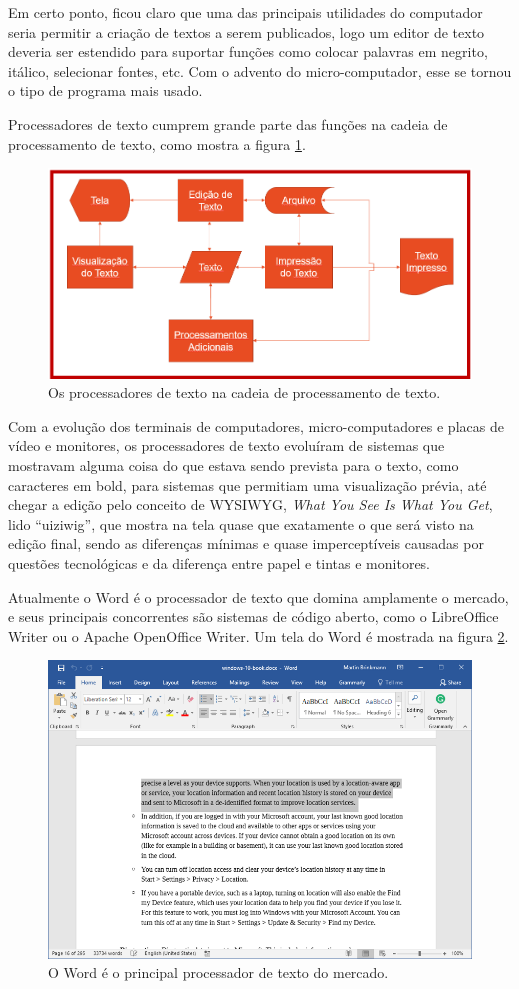 Em certo ponto,  ficou claro que uma das principais utilidades do computador seria permitir a criação de textos a serem publicados, logo um editor de texto deveria ser estendido para suportar funções como colocar palavras em negrito, itálico, selecionar fontes, etc. Com o advento do micro-computador, esse se tornou o tipo de programa mais usado. 

Processadores de texto cumprem grande parte das funções na cadeia de processamento de texto, como mostra a figura \ref{fig:processador}.

\begin{figure}[hbt]
    \centering
    \includegraphics[width=0.7\linewidth]{Images/processador}
    \caption[Os processadores de texto]{Os processadores de texto na cadeia de processamento de texto.}
    \label{fig:processador}
\end{figure}

Com a evolução dos terminais de computadores, micro-computadores e placas de vídeo e monitores, os processadores de texto evoluíram de sistemas que mostravam alguma coisa do que estava sendo prevista para o texto, como caracteres em bold, para sistemas que permitiam uma visualização prévia, até chegar a edição pelo conceito de WYSIWYG, \textit{What You See Is What You Get}, lido \enquote{uiziwig},  que mostra na tela quase que exatamente o que será visto na edição final, sendo as diferenças mínimas e quase imperceptíveis causadas por questões tecnológicas e da diferença entre papel e tintas e monitores.


Atualmente o Word é o processador de texto que domina amplamente o mercado, e seus principais concorrentes são sistemas de código aberto, como o LibreOffice Writer ou o Apache OpenOffice Writer. Um tela do Word é mostrada na figura \ref{fig:word}.

\begin{figure}[hbt]
    \centering
    \includegraphics[width=0.7\linewidth]{Images/word}
    \caption[O Word]{O Word é o principal processador de texto do mercado.}
    \label{fig:word}
\end{figure}

